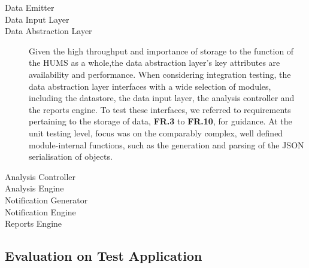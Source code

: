 \begin{description}
\item[Data Emitter]
\item[Data Input Layer]
\item[Data Abstraction Layer] %
Given the high throughput and importance of storage to the function of the HUMS as a whole,the data abstraction layer's key attributes are availability and performance. When considering integration testing, the data abstraction layer interfaces with a wide selection of modules, including the datastore, the data input layer, the analysis controller and the reports engine. To test these interfaces, we referred to requirements pertaining to the storage of data, \textbf{FR.3} to \textbf{FR.10}, for guidance. %
 At the unit testing level, focus was on the comparably complex, well defined module-internal functions, such as the generation and parsing of the JSON serialisation of objects.
\item[Analysis Controller]
\item[Analysis Engine]
\item[Notification Generator]
\item[Notification Engine]
\item[Reports Engine]
\end{description}

\subsection{Evaluation on Test Application}
\label{sec:prototype-evaluation}

